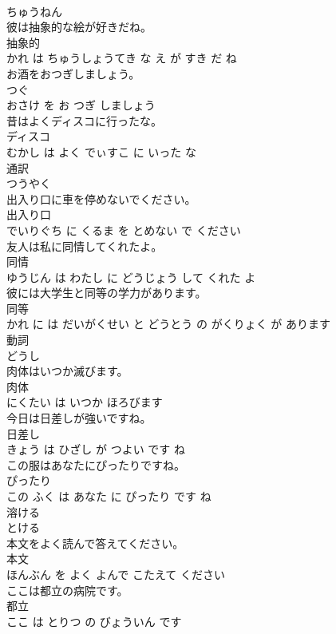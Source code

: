 \documentclass[8pt]{extreport}
\begin{document}
\begin{CJK}{UTF8}{min}
\\	ちゅうねん		
\\	彼は抽象的な絵が好きだね。	
\\	抽象的 
\\	かれ は ちゅうしょうてき な え が すき だ ね			
\\	お酒をおつぎしましょう。	
\\	つぐ 
\\	おさけ を お つぎ しましょう			
\\	昔はよくディスコに行ったな。	
\\	ディスコ 
\\	むかし は よく でぃすこ に いった な			
\\	通訳	
\\	つうやく		
\\	出入り口に車を停めないでください。	
\\	出入り口 
\\	でいりぐち に くるま を とめない で ください			
\\	友人は私に同情してくれたよ。	
\\	同情 
\\	ゆうじん は わたし に どうじょう して くれた よ			
\\	彼には大学生と同等の学力があります。	
\\	同等 
\\	かれ に は だいがくせい と どうとう の がくりょく が あります			
\\	動詞	
\\	どうし		
\\	肉体はいつか滅びます。	
\\	肉体 
\\	にくたい は いつか ほろびます			
\\	今日は日差しが強いですね。	
\\	日差し 
\\	きょう は ひざし が つよい です ね			
\\	この服はあなたにぴったりですね。	
\\	ぴったり 
\\	この ふく は あなた に ぴったり です ね			
\\	溶ける	
\\	とける		
\\	本文をよく読んで答えてください。	
\\	本文 
\\	ほんぶん を よく よんで こたえて ください			
\\	ここは都立の病院です。	
\\	都立 
\\	ここ は とりつ の びょういん です			

\end{CJK}
\end{document}
